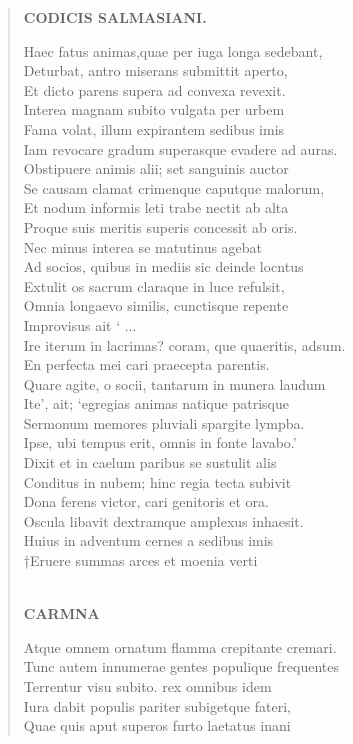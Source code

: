 \documentclass[11pt, a4paper]{report}
\begin{document}
\begin{verse}
    \begin{center} \textbf{CODICIS SALMASIANI.} \end{center} \marginpar{[59]} Haec fatus animas,quae per iuga longa sedebant, \\ Deturbat, antro miserans submittit aperto, \\ Et dicto parens supera ad convexa revexit. \\ Interea magnam subito vulgata per urbem \\ Fama volat, illum expirantem sedibus imis \\ Iam revocare gradum superasque evadere ad auras. \\ Obstipuere animis alii; set sanguinis auctor \\ Se causam clamat crimenque caputque malorum, \\ Et nodum informis leti trabe nectit ab alta \\ Proque suis meritis superis concessit ab oris. \\ Nec minus interea se matutinus agebat \\ Ad socios, quibus in mediis sic deinde locntus \\ Extulit os sacrum claraque in luce refulsit, \\ Omnia longaevo similis, cunctisque repente \\  \lbrack Improvisus ait \rbrack  ‘ \lbrack ... \rbrack  \\ Ire iterum in lacrimas? coram, que quaeritis, adsum. \\ En perfecta mei cari praecepta parentis. \\ Quare agite, o socii, tantarum in munera laudum \\ Ite’, ait; ‘egregias animas natique patrisque \\ Sermonum memores pluviali spargite lympba. \\ Ipse, ubi tempus erit, omnis in fonte lavabo.’ \\ Dixit et in caelum paribus se sustulit alis \\ Conditus in nubem; hinc regia tecta subivit \\ Dona ferens victor, cari genitoris et ora. \\ Oscula libavit dextramque amplexus inhaesit. \\ Huius in adventum cernes a sedibus imis \\ †Eruere summas arces et moenia verti \\ 
        ﻿\pagebreak 
    \begin{center} \textbf{CARMNA} \end{center} \marginpar{[60]} Atque omnem ornatum flamma crepitante cremari. \\ Tunc autem innumerae gentes populique frequentes \\ Terrentur visu subito. rex omnibus idem \\ Iura dabit populis pariter subigetque fateri, \\ Quae quis aput superos furto laetatus inani \\ 

\end{verse}
\end{document}
